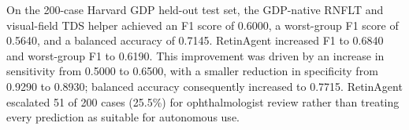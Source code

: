 On the 200-case Harvard GDP held-out test set, the GDP-native RNFLT and
visual-field TDS helper achieved an F1 score of 0.6000, a worst-group F1 score
of 0.5640, and a balanced accuracy of 0.7145. RetinAgent increased F1 to
0.6840 and worst-group F1 to 0.6190. This improvement was driven by an increase
in sensitivity from 0.5000 to 0.6500, with a smaller reduction in specificity
from 0.9290 to 0.8930; balanced accuracy consequently increased to 0.7715.
RetinAgent escalated 51 of 200 cases (25.5\%) for ophthalmologist review rather
than treating every prediction as suitable for autonomous use.
